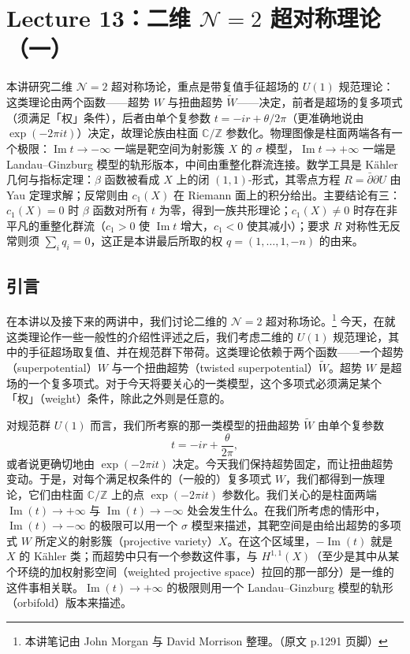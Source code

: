 \section{Lecture 13：二维 $\mathcal{N}=2$ 超对称理论（一）}

\begin{keytakeaways}
本讲研究二维 $\mathcal{N}=2$ 超对称场论，重点是带复值手征超场的 $U(1)$ 规范理论：这类理论由两个函数——超势 $W$ 与扭曲超势 $\widetilde W$——决定，前者是超场的复多项式（须满足「权」条件），后者由单个复参数 $t=-ir+\theta/2\pi$（更准确地说由 $\exp(-2\pi it)$）决定，故理论族由柱面 $\mathbb{C}/\mathbb{Z}$ 参数化。物理图像是柱面两端各有一个极限：$\operatorname{Im}t\to-\infty$ 一端是靶空间为射影簇 $X$ 的 $\sigma$ 模型，$\operatorname{Im}t\to+\infty$ 一端是 Landau--Ginzburg 模型的轨形版本，中间由重整化群流连接。数学工具是 Kähler 几何与指标定理：$\beta$ 函数被看成 $X$ 上的闭 $(1,1)$-形式，其零点方程 $R=\bar\partial\partial U$ 由 Yau 定理求解；反常则由 $c_1(X)$ 在 Riemann 面上的积分给出。主要结论有三：$c_1(X)=0$ 时 $\beta$ 函数对所有 $t$ 为零，得到一族共形理论；$c_1(X)\neq0$ 时存在非平凡的重整化群流（$c_1>0$ 使 $\operatorname{Im}t$ 增大，$c_1<0$ 使其减小）；要求 $R$ 对称性无反常则须 $\sum_iq_i=0$，这正是本讲最后所取的权 $q=(1,\dots,1,-n)$ 的由来。
\end{keytakeaways}

\subsection{引言}

在本讲以及接下来的两讲中，我们讨论二维的 $\mathcal{N}=2$ 超对称场论。\footnote{本讲笔记由 John Morgan 与 David Morrison 整理。（原文 p.1291 页脚）} 今天，在就这类理论作一些一般性的介绍性评述之后，我们考虑二维的 $U(1)$ 规范理论，其中的手征超场取复值、并在规范群下带荷。这类理论依赖于两个函数——一个超势（superpotential）$W$ 与一个扭曲超势（twisted superpotential）$\widetilde W$。超势 $W$ 是超场的一个复多项式。对于今天将要关心的一类模型，这个多项式必须满足某个「权」（weight）条件，除此之外则是任意的。

对规范群 $U(1)$ 而言，我们所考察的那一类模型的扭曲超势 $\widetilde W$ 由单个复参数
\[
t=-ir+\frac{\theta}{2\pi},
\]
或者说更确切地由 $\exp(-2\pi it)$ 决定。今天我们保持超势固定，而让扭曲超势变动。于是，对每个满足权条件的（一般的）复多项式 $W$，我们都得到一族理论，它们由柱面 $\mathbb{C}/\mathbb{Z}$ 上的点 $\exp(-2\pi it)$ 参数化。我们关心的是柱面两端 $\operatorname{Im}(t)\to+\infty$ 与 $\operatorname{Im}(t)\to-\infty$ 处会发生什么。在我们所考虑的情形中，$\operatorname{Im}(t)\to-\infty$ 的极限可以用一个 $\sigma$ 模型来描述，其靶空间是由给出超势的多项式 $W$ 所定义的射影簇（projective variety）$X$。在这个区域里，$-\operatorname{Im}(t)$ 就是 $X$ 的 Kähler 类；而超势中只有一个参数这件事，与 $H^{1,1}(X)$（至少是其中从某个环绕的加权射影空间（weighted projective space）拉回的那一部分）是一维的这件事相关联。$\operatorname{Im}(t)\to+\infty$ 的极限则用一个 Landau--Ginzburg 模型的轨形（orbifold）版本来描述。


